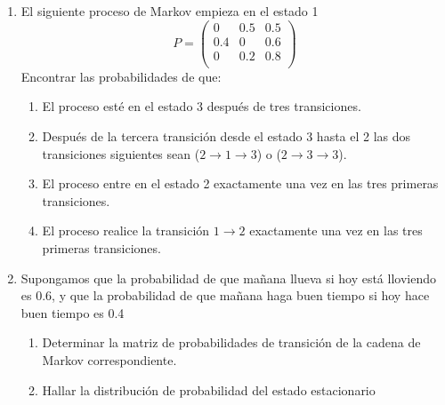 \documentclass{templateNote}
\begin{document}
\begin{enumerate}
    \newpage
    \item El siguiente proceso de Markov empieza en el estado 1
    \[
    P = \begin{pmatrix}
        0   & 0.5 & 0.5 \\
        0.4 & 0   & 0.6 \\
        0   & 0.2 & 0.8 \\
    \end{pmatrix}
    \]
    Encontrar las probabilidades de que:
    \begin{enumerate}[label=\alph*)]
        \item El proceso esté en el estado 3 después de tres transiciones.
        \item Después de la tercera transición desde el estado 3 hasta el 2 las dos transiciones siguientes
        sean ($2\rightarrow1\rightarrow3$) o ($2\rightarrow3\rightarrow3$).
        \item El proceso entre en el estado 2 exactamente una vez en las tres primeras transiciones.
        \item El proceso realice la transición $1\rightarrow2$ exactamente una vez en las tres primeras
        transiciones.
    \end{enumerate}


    \newpage
    \item Supongamos que la probabilidad de que mañana llueva si hoy está lloviendo es 0.6, y que
    la probabilidad de que mañana haga buen tiempo si hoy hace buen tiempo es 0.4
    \begin{enumerate}[label=\alph*)]
        \item Determinar la matriz de probabilidades de transición de la cadena de Markov
        correspondiente.
        \item Hallar la distribución de probabilidad del estado estacionario
    \end{enumerate}



\end{enumerate}
\end{document}
